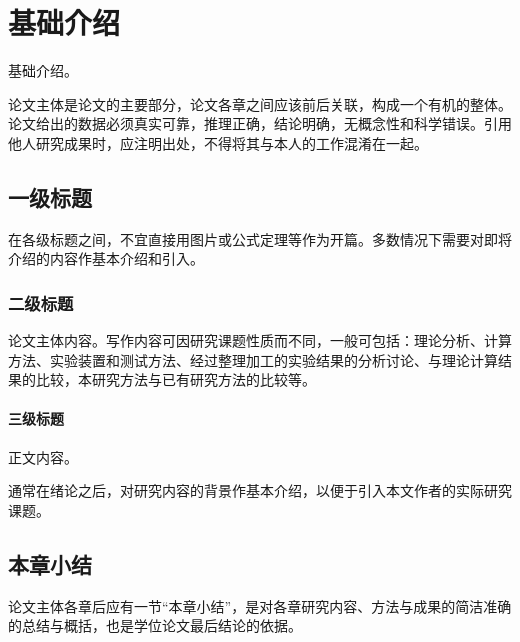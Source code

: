 
\chapter{基础介绍}
	基础介绍。
	
	论文主体是论文的主要部分，论文各章之间应该前后关联，构成一个有机的整体。论文给出的数据必须真实可靠，推理正确，结论明确，无概念性和科学错误。引用他人研究成果时，应注明出处，不得将其与本人的工作混淆在一起。

\section{一级标题}
	在各级标题之间，不宜直接用图片或公式定理等作为开篇。多数情况下需要对即将介绍的内容作基本介绍和引入。

\subsection{二级标题}
    论文主体内容。写作内容可因研究课题性质而不同，一般可包括：理论分析、计算方法、实验装置和测试方法、经过整理加工的实验结果的分析讨论、与理论计算结果的比较，本研究方法与已有研究方法的比较等。

\subsubsection{三级标题}
    正文内容。
    
    通常在绪论之后，对研究内容的背景作基本介绍，以便于引入本文作者的实际研究课题。
    
\section{本章小结}
    论文主体各章后应有一节“本章小结”，是对各章研究内容、方法与成果的简洁准确的总结与概括，也是学位论文最后结论的依据。